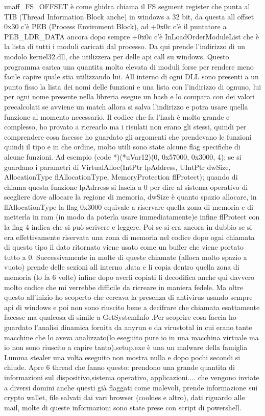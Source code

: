 \documentclass[a4paper,11pt]{article}
\theoremstyle{plain}
\theoremstyle{definition}
\theoremstyle{remark}
\begin{document}
unaff\_FS\_OFFSET è come ghidra chiama il FS segment register che punta al TIB (Thread Information Block anche) in windows a 32 bit, da questa all offset 0x30 c'è PEB (Process Enviroment Block), ad +0x0c c'è il puntatore a PEB\_LDR\_DATA ancora dopo sempre +0x0c c'è InLoadOrderModuleList che è la lista di tutti i moduli caricati dal processo. Da qui prende l'indirizzo di un modolo kernel32.dll, che utilizzera per delle api call su windows. Questo programma carica una quantita molto elevata di moduli forse per rendere meno facile capire quale stia utilizzando lui. All interno di ogni DLL sono presenti a un punto fisso la lista dei nomi delle funzioni e una lista con l'indirizzo di ognuno, lui per ogni nome presente nella libreria esegue un hash e lo compara con dei valori precalcolati se avviene un match allora si salva l'indirizzo e potra usare quella funzione al momento necessario. Il codice che fa l'hash è molto grande e complesso, ho provato a ricrearlo ma i risulati non erano gli stessi, quindi per comprendere cosa facesse ho guardato gli argomenti che prendevano le funzioni quindi il tipo e in che ordine, molto utili sono state alcune flag specifiche di alcune funzioni. Ad esempio (code *)(*uVar12)(0, 0x57000, 0x3000, 4); se si guardano i parametri di VirtualAlloc(IntPtr lpAddress, UIntPtr dwSize, AllocationType flAllocationType, MemoryProtection flProtect); quando di chiama questa funzione lpAdrress si lascia a 0 per dire al sistema operativo di scegliere dove allocare la regione di memoria, dwSize è quanto spazio allocare, in flAllocationType la flag 0x3000 equivale a riservare quella zona di memoria e di metterla in ram (in modo da poterla usare immediatamente)e infine flProtect con la flag 4 indica che si può scrivere e leggere. Poi se si era ancora in dubbio se si era effettivamente riservata una zona di memoria nel codice dopo ogni chiamata di questo tipo il dato ritornato viene usato come un buffer che viene portato tutto a 0. Successivamente in molte di queste chiamate (alloca molto spazio a vuoto) prende delle sezioni all interno .data e li copia dentro quella zona di memoria (lo fa 6 volte) infine dopo averli copiati li decodifica anche qui davvero molto codice che mi verrebbe difficile da ricreare in maniera fedele. Ma oltre questo all'inizio ho scoperto che cercava la presenza di antivirus usando sempre api di windows e poi non sono riuscito bene a decifrare che chiamata esattamente facesse ma qualcosa di simile a GetSystemInfo .Per scoprire cosa faccia ho guardato l'analisi dinamica fornita da anyrun e da virustotal in cui erano tante macchine che lo aveva analizzato(lo eseguito pure io in una macchina virtuale ma io non sono riuscito a capire tanto),setup.exe è una un malware della famiglia Lumma stealer una volta eseguito non mostra nulla e dopo pochi secondi si chiude. Apre 6 thread che fanno questo: prendono una grande quantita di informazioni sul dispositivo,sistema operativo, applicazioni.... che vengono inviate a diversi domini anche questi già flaggati come malevoli, prende informazione sui crypto wallet, file salvati dai vari browser (cookies e altro), dati riguardo alle mail, molte di queste informazioni sono state prese con script di powershell.
\end{document}
